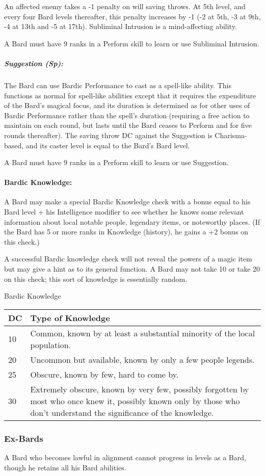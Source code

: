 An affected enemy takes a -1 penalty on will saving throws. At 5th level, and every four Bard levels thereafter, this penalty increases by -1 (-2 at 5th, -3 at 9th, -4 at 13th and -5 at 17th). Subliminal Intrusion is a mind-affecting ability.

A Bard must have 9 ranks in a Perform skill to learn or use Subliminal Intrusion.
\subparagraph{Suggestion (Sp):}
The Bard can use Bardic Performance to cast  as a spell-like ability. 
This functions as normal for spell-like abilities except that it requires the expenditure of the Bard's magical focus, and its duration is determined as for other uses of Bardic Performance rather than the spell's duration (requiring a free action to maintain on each round, but lasts until the Bard ceases to Perform and for five rounds thereafter).
The saving throw DC against the Suggestion is Charisma-based, and its caster level is equal to the Bard's Bard level.

A Bard must have 9 ranks in a Perform skill to learn or use Suggestion.
\paragraph{Bardic Knowledge:}
A Bard may make a special Bardic Knowledge check with a bonus equal to his Bard level + his Intelligence modifier to see whether he knows some relevant information about local notable people, 
legendary items, or noteworthy places. (If the Bard has 5 or more ranks in Knowledge (history), he gains a +2 bonus on this check.)

A successful Bardic knowledge check will not reveal the powers of a magic item but may give a hint as to its general function. 
A Bard may not take 10 or take 20 on this check; this sort of knowledge is essentially random.
\begin{tableonecolumn}
\caption{Bardic Knowledge}
\label{tab:BardicKnowledge}
\begin{tabular}{|p{0.4cm}|p{6cm}|}
\hline
DC &Type of Knowledge\\
\hline
10 &Common, known by at least a substantial minority of the local population.\\
20 &Uncommon but available, known by only a few people legends.\\
25 &Obscure, known by few, hard to come by.\\
30 &Extremely obscure, known by very few, possibly forgotten by most who once knew it, possibly known only by those who don't understand the significance of the knowledge.\\
\hline
\end{tabular}
\end{tableonecolumn}
\subsubsection{Ex-Bards}
A Bard who becomes lawful in alignment cannot progress in levels as a Bard, though he retains all his Bard abilities.